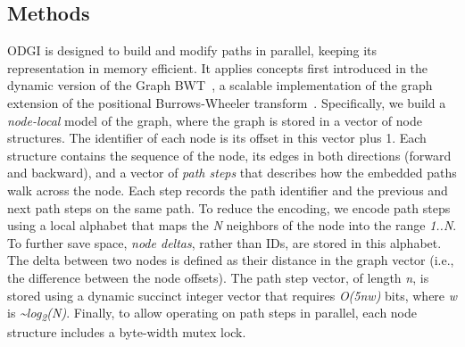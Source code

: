 \documentclass{bioinfo}
\begin{document}
    \begin{methods}
        \section{Methods}

        ODGI is designed to build and modify paths in parallel, keeping its representation in memory efficient. It
        applies concepts first introduced in the dynamic version of the Graph BWT~\citep{31406990}, a scalable
        implementation of the graph extension of the positional Burrows-Wheeler transform~\citep{28702075}. Specifically,
        we build a \textit{node-local} model of the graph, where the graph is stored in a vector of node structures.
        The identifier of each node is its offset in this vector plus 1. Each structure contains the sequence of the
        node, its edges in both directions (forward and backward), and a vector of \textit{path steps} that describes
        how the embedded paths walk across the node. Each step records the path identifier and the previous and next
        path steps on the same path. To reduce the encoding, we encode path steps using a local alphabet that maps the
        \textit{N} neighbors of the node into the range \textit{1..N}. To further save space, \textit{node deltas},
        rather than IDs, are stored in this alphabet. The delta between two nodes is defined as their distance in the
        graph vector (i.e., the difference between the node offsets). The path step vector, of length \textit{n}, is
        stored using a dynamic succinct integer vector that requires \textit{O(5nw)} bits, where \textit{w} is
        \textit{\textasciitilde log\textsubscript{2}(N)}. Finally, to allow operating on path steps in parallel, each node structure includes a
        byte-width mutex lock.


\end{methods}
\end{document}
